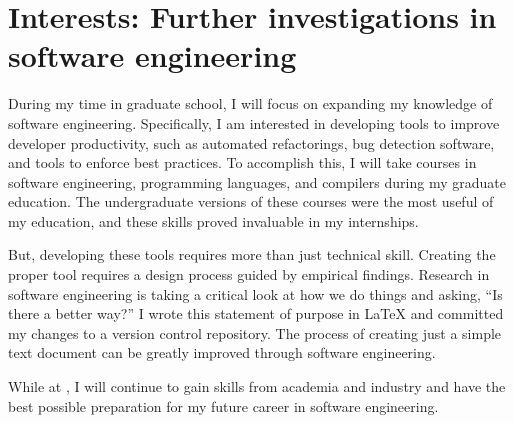 \section*{Interests: Further investigations in software engineering}
During my time in graduate school, I will focus on expanding my knowledge of software engineering. 
Specifically, I am interested in developing tools to improve developer productivity, such as automated refactorings, bug detection software, and tools to enforce best practices. 
To accomplish this, I will take courses in software engineering, programming languages, and compilers during my graduate education. The undergraduate versions of these courses were the most useful of my education, and these skills proved invaluable in my internships. 

But, developing these tools requires more than just technical skill. 
Creating the proper tool requires a design process guided by empirical findings. Research in software engineering is taking a critical look at how we do things and asking, “Is there a better way?” 
I wrote this statement of purpose in LaTeX and committed my changes to a version control repository. 
The process of creating just a simple text document can be greatly improved through software engineering. 

While at \schoolShort, I will continue to gain skills from academia and industry and have the best possible preparation for my future career in software engineering.